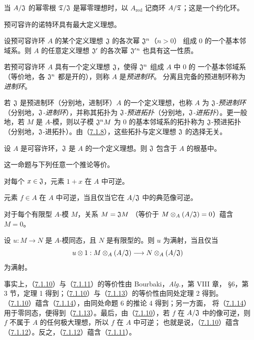 当 $A/\mathfrak J$ 的幂零根 $\mathfrak T/\mathfrak J$ 是幂零理想时，以 $A_{\mathrm{red}}$ 记商环
$A/\mathfrak T$；这是一个约化环。

预可容许的诺特环具有最大定义理想。

设预可容许环 $A$ 的某个定义理想 $\mathfrak J$ 的各次幂 $\mathfrak J^n$（$n>0$）
组成 $0$ 的一个基本邻域系。则 $A$ 的任意定义理想 $\mathfrak J'$ 的各次幂
$\mathfrak J'{}^n$ 也具有这一性质。

若预可容许环 $A$ 具有一个定义理想 $\mathfrak J$，使得 $\mathfrak J^n$ 组成 $A$ 中 $0$ 的
一个基本邻域系（等价地，各 $\mathfrak J^n$ 都是开的），则称 $A$ 是\emph{预进制环}。
分离且完备的预进制环称为\emph{进制环}。

若 $\mathfrak J$ 是预进制环（分别地，进制环）$A$ 的一个定义理想，也称 $A$ 为
\emph{$\mathfrak J$-预进制环}（分别地，\emph{$\mathfrak J$-进制环}），并称其拓扑为
\emph{$\mathfrak J$-预进拓扑}（分别地，\emph{$\mathfrak J$-进拓扑}）。更一般地，若 $M$ 是
$A$-模，则以子模 $\mathfrak J^nM$ 为 $0$ 的基本邻域系的拓扑称为
$\mathfrak J$-预进拓扑（分别地，$\mathfrak J$-进拓扑）。由（\hyperlink{para:0:7.1.8}{7.1.8}），这些拓扑与定义理想
$\mathfrak J$ 的选择无关。

设 $A$ 是可容许环，$\mathfrak J$ 是 $A$ 的一个定义理想。则 $\mathfrak J$ 包含于 $A$ 的根基中。

这一命题与下列任意一个推论等价。

对每个 $x\in\mathfrak J$，元素 $1+x$ 在 $A$ 中可逆。

元素 $f\in A$ 在 $A$ 中可逆，当且仅当它在 $A/\mathfrak J$ 中的典范像可逆。

对于每个有限型 $A$-模 $M$，关系 $M=\mathfrak J M$
（等价于 $M\otimes_A(A/\mathfrak J)=0$）蕴含 $M=0$。

设 $u:M\to N$ 是 $A$-模同态，且 $N$ 是有限型的。则 $u$ 为满射，当且仅当
\[
 u\otimes 1:M\otimes_A(A/\mathfrak J)\longrightarrow N\otimes_A(A/\mathfrak J)
\]
为满射。

事实上，（\hyperlink{para:0:7.1.10}{7.1.10}）与（\hyperlink{para:0:7.1.11}{7.1.11}）的等价性由 Bourbaki，\textit{Alg.}，第 VIII 章，
§6，第 3 节，定理 1 得到；（\hyperlink{para:0:7.1.10}{7.1.10}）与（\hyperlink{para:0:7.1.13}{7.1.13}）的等价性由同处定理 2 得到。
（\hyperlink{para:0:7.1.10}{7.1.10}）蕴含（\hyperlink{para:0:7.1.14}{7.1.14}），由同处命题 6 的推论 4 得到；另一方面，
将（\hyperlink{para:0:7.1.14}{7.1.14}）用于零同态，便得到（\hyperlink{para:0:7.1.13}{7.1.13}）。最后，由（\hyperlink{para:0:7.1.10}{7.1.10}），若 $f$ 在
$A/\mathfrak J$ 中的像可逆，则 $f$ 不属于 $A$ 的任何极大理想，所以 $f$ 在 $A$ 中可逆；
也就是说，（\hyperlink{para:0:7.1.10}{7.1.10}）蕴含（\hyperlink{para:0:7.1.12}{7.1.12}）。反之，（\hyperlink{para:0:7.1.12}{7.1.12}）蕴含（\hyperlink{para:0:7.1.11}{7.1.11}）。

